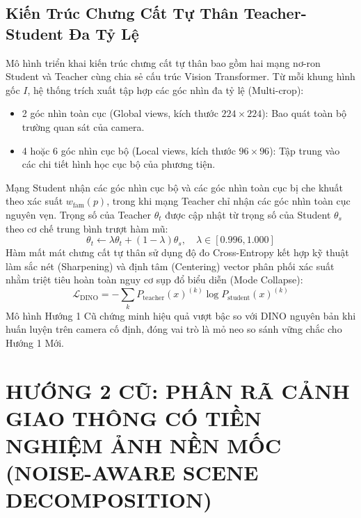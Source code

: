 \documentclass[11pt,a4paper]{article}
\begin{document}
\subsection{Kiến Trúc Chưng Cất Tự Thân Teacher-Student Đa Tỷ Lệ}
Mô hình triển khai kiến trúc chưng cất tự thân bao gồm hai mạng nơ-ron Student và Teacher cùng chia sẻ cấu trúc Vision Transformer. Từ mỗi khung hình gốc $I$, hệ thống trích xuất tập hợp các góc nhìn đa tỷ lệ (Multi-crop):
\begin{itemize}
    \item 2 góc nhìn toàn cục (Global views, kích thước $224 \times 224$): Bao quát toàn bộ trường quan sát của camera.
    \item 4 hoặc 6 góc nhìn cục bộ (Local views, kích thước $96 \times 96$): Tập trung vào các chi tiết hình học cục bộ của phương tiện.
\end{itemize}
Mạng Student nhận các góc nhìn cục bộ và các góc nhìn toàn cục bị che khuất theo xác suất $w_{\text{fam}}(p)$, trong khi mạng Teacher chỉ nhận các góc nhìn toàn cục nguyên vẹn. Trọng số của Teacher $\theta_t$ được cập nhật từ trọng số của Student $\theta_s$ theo cơ chế trung bình trượt hàm mũ:
\begin{equation}
    \theta_t \leftarrow \lambda \theta_t + (1 - \lambda) \theta_s, \quad \lambda \in [0.996, 1.000]
\end{equation}
Hàm mất mát chưng cất tự thân sử dụng độ đo Cross-Entropy kết hợp kỹ thuật làm sắc nét (Sharpening) và định tâm (Centering) vector phân phối xác suất nhằm triệt tiêu hoàn toàn nguy cơ sụp đổ biểu diễn (Mode Collapse):
\begin{equation}
    \mathcal{L}_{\text{DINO}} = - \sum_{k} P_{\text{teacher}}(x)^{(k)} \log P_{\text{student}}(x)^{(k)}
\end{equation}
Mô hình Hướng 1 Cũ chứng minh hiệu quả vượt bậc so với DINO nguyên bản khi huấn luyện trên camera cố định, đóng vai trò là mỏ neo so sánh vững chắc cho Hướng 1 Mới.

\section{HƯỚNG 2 CŨ: PHÂN RÃ CẢNH GIAO THÔNG CÓ TIỀN NGHIỆM ẢNH NỀN MỐC (NOISE-AWARE SCENE DECOMPOSITION)}
\end{document}

